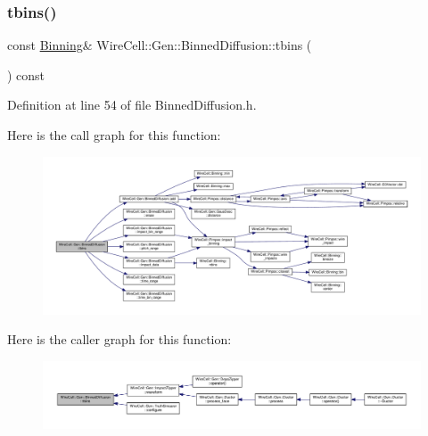 \subsubsection{\texorpdfstring{tbins()}{tbins()}}
{\footnotesize\ttfamily const \hyperlink{class_wire_cell_1_1_binning}{Binning}\& Wire\+Cell\+::\+Gen\+::\+Binned\+Diffusion\+::tbins (\begin{DoxyParamCaption}{ }\end{DoxyParamCaption}) const\hspace{0.3cm}{\ttfamily [inline]}}



Definition at line 54 of file Binned\+Diffusion.\+h.

Here is the call graph for this function\+:
\nopagebreak
\begin{figure}[H]
\begin{center}
\leavevmode
\includegraphics[width=350pt]{class_wire_cell_1_1_gen_1_1_binned_diffusion_add5e00394c16a9fc27be4b7d617fa59b_cgraph}
\end{center}
\end{figure}
Here is the caller graph for this function\+:
\nopagebreak
\begin{figure}[H]
\begin{center}
\leavevmode
\includegraphics[width=350pt]{class_wire_cell_1_1_gen_1_1_binned_diffusion_add5e00394c16a9fc27be4b7d617fa59b_icgraph}
\end{center}
\end{figure}
\mbox{\label{class_wire_cell_1_1_gen_1_1_binned_diffusion_a5419eac4bcb3240c4345c9ddc8eb5684}} 
